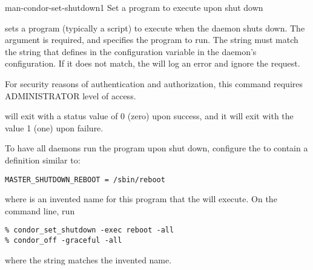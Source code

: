 \begin{ManPage}{}{man-condor-set-shutdown}{1}
{Set a program to execute upon  shut down}

\Synopsis {}
\ToolArgsBase

\ToolDebugOption
\ToolWhere

\Description 

 sets a program (typically a script) to execute
when the  daemon shuts down.
The  argument is required,
and specifies the program to run.  
The string  must match the
string that defines  in the configuration variable
 in the  daemon's
configuration. 
If it does not match, the  will log an error and ignore the
request.

For security reasons of authentication and authorization,
this command requires ADMINISTRATOR level of access.

\begin{Options}
  \ToolArgsBaseDesc
  \ToolDebugDesc
  \ToolArgsLocateDesc
\end{Options}

\ExitStatus
{} will exit with a status value of 0 (zero) upon
success, and it will exit with the value 1 (one) upon failure.


\Examples
To have all  daemons run the program
 upon shut down, configure the  
to contain a definition similar to:
\begin{verbatim}
MASTER_SHUTDOWN_REBOOT = /sbin/reboot
\end{verbatim}
where  is an invented name for this program that
the  will execute.
On the command line, run
\begin{verbatim}
% condor_set_shutdown -exec reboot -all
% condor_off -graceful -all
\end{verbatim}
where the string \verb@reboot@ matches the invented name.

\end{ManPage}
